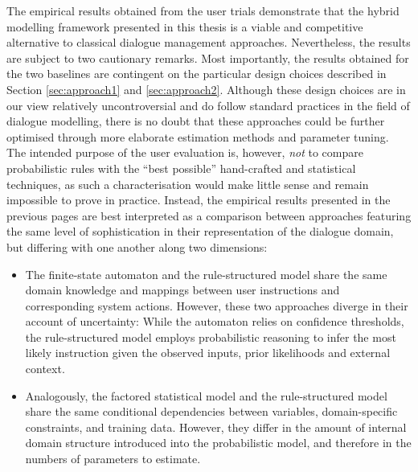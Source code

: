 The empirical results obtained from the user trials demonstrate that the hybrid modelling framework presented in this thesis is a viable and competitive alternative to classical dialogue management approaches.  Nevertheless, the results are subject to two cautionary remarks.  Most importantly, the results obtained for the two baselines are contingent on the particular design choices described in Section \ref{sec:approach1} and \ref{sec:approach2}.  Although these design choices are in our view relatively uncontroversial and do follow standard practices in the field of dialogue modelling, there is no doubt that these approaches could be further optimised through more elaborate estimation methods and parameter tuning. The intended purpose of the user evaluation is, however, \textit{not} to compare probabilistic rules with the ``best possible'' hand-crafted and statistical techniques, as such a characterisation would make little sense and remain impossible to prove in practice. Instead, the empirical results presented in the previous pages are best interpreted as a comparison between approaches featuring the same level of sophistication in their representation of the dialogue domain, but differing with one another along two dimensions:
\begin{itemize}
\item The finite-state automaton and the rule-structured model share the same domain knowledge and mappings between user instructions and corresponding system actions.  However, these two approaches diverge in their account of uncertainty: While the automaton relies on confidence thresholds, the rule-structured model employs probabilistic reasoning to infer the most likely instruction given the observed inputs, prior likelihoods and external context.
\item Analogously, the factored statistical model and the rule-structured model share the same conditional dependencies between variables, domain-specific constraints, and training data. However, they differ in the amount of internal domain structure introduced into the probabilistic model, and therefore in the numbers of parameters to estimate.
\end{itemize}


